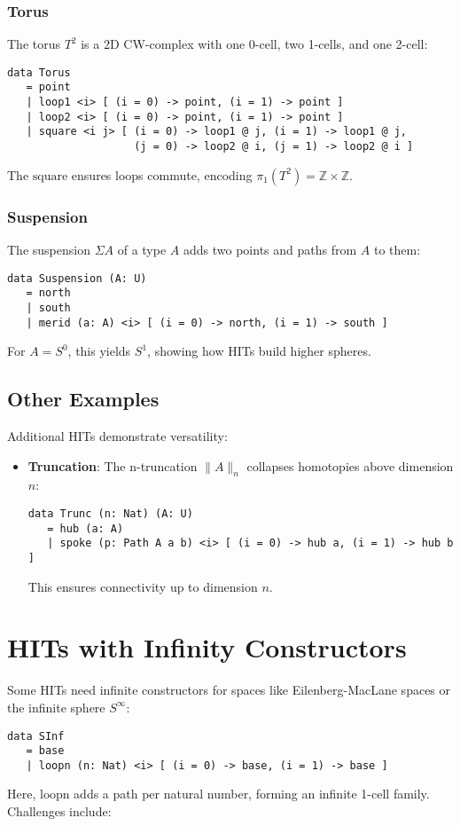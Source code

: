 \documentclass{article}
\theoremstyle{definition}
\begin{document}
\subsubsection{Torus}
The torus \( T^2 \) is a 2D CW-complex with one 0-cell, two
1-cells, and one 2-cell:
\begin{lstlisting}
data Torus
   = point
   | loop1 <i> [ (i = 0) -> point, (i = 1) -> point ]
   | loop2 <i> [ (i = 0) -> point, (i = 1) -> point ]
   | square <i j> [ (i = 0) -> loop1 @ j, (i = 1) -> loop1 @ j,
                    (j = 0) -> loop2 @ i, (j = 1) -> loop2 @ i ]
\end{lstlisting}
The \( \text{square} \) ensures loops commute, encoding
\( \pi_1(T^2) = \mathbb{Z} \times \mathbb{Z} \).

\subsubsection{Suspension}
The suspension \( \Sigma A \) of a type \( A \) adds two points
and paths from \( A \) to them:
\begin{lstlisting}
data Suspension (A: U)
   = north
   | south
   | merid (a: A) <i> [ (i = 0) -> north, (i = 1) -> south ]
\end{lstlisting}
For \( A = S^0 \), this yields \( S^1 \), showing how HITs
build higher spheres.

\subsection{Other Examples}
Additional HITs demonstrate versatility:

\begin{itemize}
    \item \textbf{Truncation}: The n-truncation
      \( \| A \|_n \) collapses homotopies above dimension
      \( n \):
    \begin{lstlisting}
data Trunc (n: Nat) (A: U)
   = hub (a: A)
   | spoke (p: Path A a b) <i> [ (i = 0) -> hub a, (i = 1) -> hub b ]
    \end{lstlisting}
    This ensures connectivity up to dimension \( n \).
\end{itemize}

\section{HITs with Infinity Constructors}
Some HITs need infinite constructors for spaces like
Eilenberg-MacLane spaces or the infinite sphere \( S^\infty \):
\begin{lstlisting}
data SInf
   = base
   | loopn (n: Nat) <i> [ (i = 0) -> base, (i = 1) -> base ]
\end{lstlisting}
Here, \( \text{loopn} \) adds a path per natural number,
forming an infinite 1-cell family. Challenges include:
\end{document}
